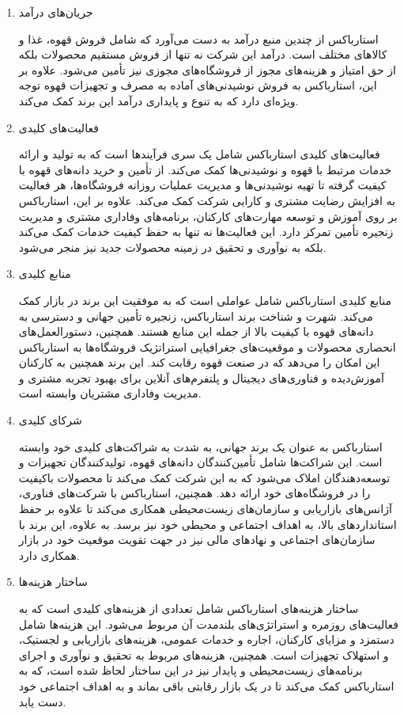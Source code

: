 \documentclass[dvipsnames, svgnames, x11names, 11pt, twocolumn]{article}
\begin{document}
\begin{enumerate}
\item 
جریان‌های درآمد

استارباکس از چندین منبع درآمد به دست می‌آورد که شامل فروش قهوه، غذا و کالاهای مختلف است. درآمد این شرکت نه تنها از فروش مستقیم محصولات بلکه از حق امتیاز و هزینه‌های مجوز از فروشگاه‌های مجوزی نیز تأمین می‌شود. علاوه بر این، استارباکس به فروش نوشیدنی‌های آماده به مصرف و تجهیزات قهوه توجه ویژه‌ای دارد که به تنوع و پایداری درآمد این برند کمک می‌کند.

\item 
فعالیت‌های کلیدی

فعالیت‌های کلیدی استارباکس شامل یک سری فرآیندها است که به تولید و ارائه خدمات مرتبط با قهوه و نوشیدنی‌ها کمک می‌کند. از تأمین و خرید دانه‌های قهوه با کیفیت گرفته تا تهیه نوشیدنی‌ها و مدیریت عملیات روزانه فروشگاه‌ها، هر فعالیت به افزایش رضایت مشتری و کارایی شرکت کمک می‌کند. علاوه بر این، استارباکس بر روی آموزش و توسعه مهارت‌های کارکنان، برنامه‌های وفاداری مشتری و مدیریت زنجیره تأمین تمرکز دارد. این فعالیت‌ها نه تنها به حفظ کیفیت خدمات کمک می‌کند بلکه به نوآوری و تحقیق در زمینه محصولات جدید نیز منجر می‌شود.

\item 
منابع کلیدی

منابع کلیدی استارباکس شامل عواملی است که به موفقیت این برند در بازار کمک می‌کند. شهرت و شناخت برند استارباکس، زنجیره تأمین جهانی و دسترسی به دانه‌های قهوه با کیفیت بالا از جمله این منابع هستند. همچنین، دستورالعمل‌های انحصاری محصولات و موقعیت‌های جغرافیایی استراتژیک فروشگاه‌ها به استارباکس این امکان را می‌دهد که در صنعت قهوه رقابت کند. این برند همچنین به کارکنان آموزش‌دیده و فناوری‌های دیجیتال و پلتفرم‌های آنلاین برای بهبود تجربه مشتری و مدیریت وفاداری مشتریان وابسته است.

\item 
شرکای کلیدی

استارباکس به عنوان یک برند جهانی، به شدت به شراکت‌های کلیدی خود وابسته است. این شراکت‌ها شامل تأمین‌کنندگان دانه‌های قهوه، تولیدکنندگان تجهیزات و توسعه‌دهندگان املاک می‌شود که به این شرکت کمک می‌کند تا محصولات باکیفیت را در فروشگاه‌های خود ارائه دهد. همچنین، استارباکس با شرکت‌های فناوری، آژانس‌های بازاریابی و سازمان‌های زیست‌محیطی همکاری می‌کند تا علاوه بر حفظ استانداردهای بالا، به اهداف اجتماعی و محیطی خود نیز برسد. به علاوه، این برند با سازمان‌های اجتماعی و نهادهای مالی نیز در جهت تقویت موقعیت خود در بازار همکاری دارد.

\item 
ساختار هزینه‌ها

ساختار هزینه‌های استارباکس شامل تعدادی از هزینه‌های کلیدی است که به فعالیت‌های روزمره و استراتژی‌های بلندمدت آن مربوط می‌شود. این هزینه‌ها شامل دستمزد و مزایای کارکنان، اجاره و خدمات عمومی، هزینه‌های بازاریابی و لجستیک، و استهلاک تجهیزات است. همچنین، هزینه‌های مربوط به تحقیق و نوآوری و اجرای برنامه‌های زیست‌محیطی و پایدار نیز در این ساختار لحاظ شده است، که به استارباکس کمک می‌کند تا در یک بازار رقابتی باقی بماند و به اهداف اجتماعی خود دست یابد.

\end{enumerate}
\end{document}
